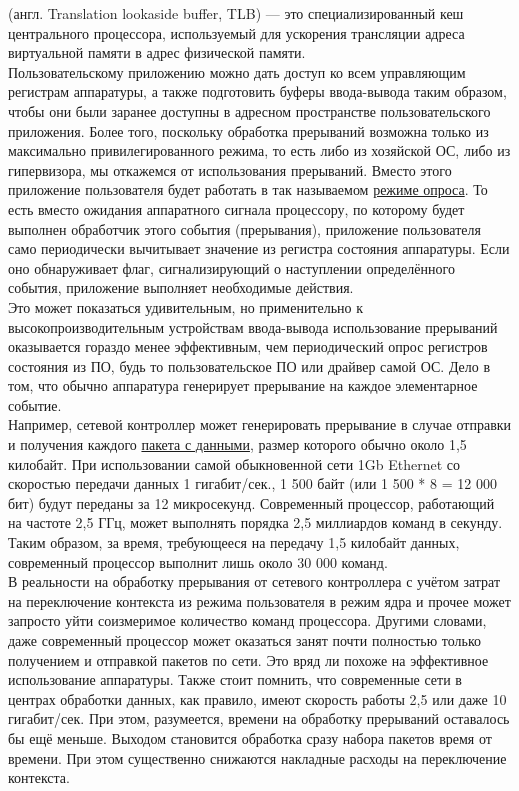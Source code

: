\documentclass[14pt, a4paper]{article}
\begin{document}
\noindent \href{https://ru.wikipedia.org/wiki/Буфер_ассоциативной_трансляции}{} (англ. Translation lookaside buffer, TLB) — это специализированный
кеш центрального процессора, используемый для ускорения трансляции адреса виртуальной памяти
в адрес физической памяти.\\

Пользовательскому приложению можно дать доступ ко всем управляющим регистрам аппаратуры, а
также подготовить буферы ввода-вывода таким образом, чтобы они были заранее доступны в
адресном пространстве пользовательского приложения. Более того, поскольку обработка прерываний
возможна только из максимально привилегированного режима, то есть либо из хозяйской ОС, либо из
гипервизора, мы откажемся от использования прерываний. Вместо этого приложение пользователя
будет работать в так называемом \href{https://en.wikipedia.org/wiki/Polling_(computer_science)}{режиме опроса}. То есть вместо ожидания аппаратного сигнала
процессору, по которому будет выполнен обработчик этого события (прерывания), приложение
пользователя само периодически вычитывает значение из регистра состояния аппаратуры. Если оно
обнаруживает флаг, сигнализирующий о наступлении определённого события, приложение выполняет
необходимые действия.\\

Это может показаться удивительным, но применительно к высокопроизводительным устройствам
ввода-вывода использование прерываний оказывается гораздо менее эффективным, чем
периодический опрос регистров состояния из ПО, будь то пользовательское ПО или драйвер самой
ОС. Дело в том, что обычно аппаратура генерирует прерывание на каждое элементарное событие.\\

Например, сетевой контроллер может генерировать прерывание в случае отправки и получения
каждого \href{https://ru.wikipedia.org/wiki/Maximum_transmission_unit}{пакета с данными}, размер которого обычно около 1,5 килобайт. При использовании самой
обыкновенной сети 1Gb Ethernet со скоростью передачи данных 1 гигабит/сек., 1 500 байт (или 1 500 *
8 = 12 000 бит) будут переданы за 12 микросекунд. Современный процессор, работающий на частоте
2,5 ГГц, может выполнять порядка 2,5 миллиардов команд в секунду. Таким образом, за время,
требующееся на передачу 1,5 килобайт данных, современный процессор выполнит лишь около 30 000
команд.\\

В реальности на обработку прерывания от сетевого контроллера с учётом затрат на переключение
контекста из режима пользователя в режим ядра и прочее может запросто уйти соизмеримое
количество команд процессора. Другими словами, даже современный процессор может оказаться
занят почти полностью только получением и отправкой пакетов по сети. Это вряд ли похоже на
эффективное использование аппаратуры. Также стоит помнить, что современные сети в центрах
обработки данных, как правило, имеют скорость работы 2,5 или даже 10 гигабит/сек. При этом,
разумеется, времени на обработку прерываний оставалось бы ещё меньше. Выходом становится
обработка сразу набора пакетов время от времени. При этом существенно снижаются накладные
расходы на переключение контекста.\\
\end{document}
